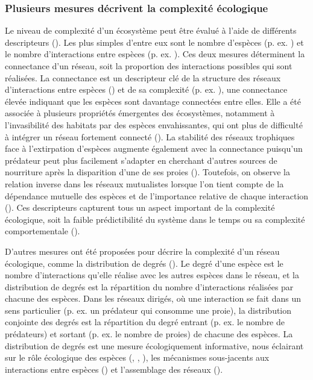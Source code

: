 \subsubsection{Plusieurs mesures décrivent la complexité écologique} 

Le niveau de complexité d'un écosystème peut être évalué à l'aide de différents
descripteurs (\cite{Landi2018Complexity}). Les plus simples d'entre eux sont le
nombre d'espèces (p. ex. \cite{May1972Will}) et le nombre d'interactions entre
espèces (p. ex. \cite{Okuyama2008Network}). Ces deux mesures déterminent la
connectance d'un réseau, soit la proportion des interactions possibles qui sont
réalisées. La connectance est un descripteur clé de la structure des réseaux
d'interactions entre espèces (\cite{Martinez1992Constant}) et de sa complexité
(p. ex. \cite{Rozdilsky2001Complexity}), une connectance élevée indiquant que
les espèces sont davantage connectées entre elles. Elle a été associée à
plusieurs propriétés émergentes des écosystèmes, notamment à l'invasibilité des
habitats par des espèces envahissantes, qui ont plus de difficulté à intégrer un
réseau fortement connecté (\cite{Smith-Ramesh2017Global}). La stabilité des
réseaux trophiques face à l'extirpation d'espèces augmente également avec la
connectance puisqu'un prédateur peut plus facilement s'adapter en cherchant
d'autres sources de nourriture après la disparition d'une de ses proies
(\cite{Dunne2002Network}). Toutefois, on observe la relation inverse dans les
réseaux mutualistes lorsque l'on tient compte de la dépendance mutuelle des
espèces et de l'importance relative de chaque interaction
(\cite{Vieira2015Simple}). Ces descripteurs capturent tous un aspect important
de la complexité écologique, soit la faible prédictibilité du système dans le
temps ou sa complexité comportementale (\cite{Strydom2021Svd}). 

D'autres mesures ont été proposées pour décrire la complexité d'un réseau
écologique, comme la distribution de degrés (\cite{Landi2018Complexity}). Le
degré d'une espèce est le nombre d'interactions qu'elle réalise avec les autres
espèces dans le réseau, et la distribution de degrés est la répartition du
nombre d'interactions réalisées par chacune des espèces. Dans les réseaux
dirigés, où une interaction se fait dans un sens particulier (p. ex. un
prédateur qui consomme une proie), la distribution conjointe des degrés est la
répartition du degré entrant (p. ex. le nombre de prédateurs) et sortant (p. ex.
le nombre de proies) de chacune des espèces. La distribution de degrés est une
mesure écologiquement informative, nous éclairant sur le rôle écologique des
espèces (\cite{Sole2001Complexity}, \cite{Dunne2002Network},
\cite{Memmott2004Tolerance}), les mécanismes sous-jacents aux interactions entre
espèces (\cite{Williams2011Biology}) et l'assemblage des réseaux
(\cite{Vazquez2005Degree}). 

